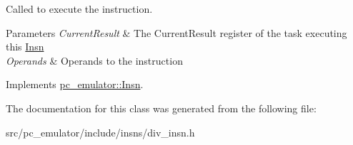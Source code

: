 Called to execute the instruction. 


\begin{DoxyParams}{Parameters}
{\em Current\+Result} & The Current\+Result register of the task executing this \hyperlink{classpc__emulator_1_1Insn}{Insn} \\
\hline
{\em Operands} & Operands to the instruction \\
\hline
\end{DoxyParams}


Implements \hyperlink{classpc__emulator_1_1Insn_a103d27030e872a799e313df16c1f3d66}{pc\+\_\+emulator\+::\+Insn}.



The documentation for this class was generated from the following file\+:\begin{DoxyCompactItemize}
\item 
src/pc\+\_\+emulator/include/insns/div\+\_\+insn.\+h\end{DoxyCompactItemize}
